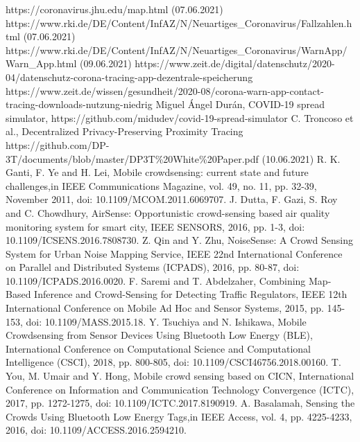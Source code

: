 \documentclass[conference,compsoc]{IEEEtran}
\begin{document}
\begin{thebibliography}{00}
 https://coronavirus.jhu.edu/map.html (07.06.2021)
 https://www.rki.de/DE/Content/InfAZ/N/Neuartiges\_Coronavirus/Fallzahlen.html (07.06.2021)
 https://www.rki.de/DE/Content/InfAZ/N/Neuartiges\_Coronavirus/WarnApp/Warn\_App.html (09.06.2021)
 https://www.zeit.de/digital/datenschutz/2020-04/datenschutz-corona-tracing-app-dezentrale-speicherung
 https://www.zeit.de/wissen/gesundheit/2020-08/corona-warn-app-contact-tracing-downloads-nutzung-niedrig
 Miguel Ángel Durán, COVID-19 spread simulator, 
https://github.com/midudev/covid-19-spread-simulator
 C. Troncoso et al., \glqq Decentralized Privacy-Preserving Proximity Tracing\grqq \\https://github.com/DP-3T/documents/blob/master/DP3T\%20White\%20Paper.pdf (10.06.2021)
 R. K. Ganti, F. Ye and H. Lei, \glqq Mobile crowdsensing: current state and future challenges,\grqq in IEEE Communications Magazine, vol. 49, no. 11, pp. 32-39, November 2011, doi: 10.1109/MCOM.2011.6069707.
 J. Dutta, F. Gazi, S. Roy and C. Chowdhury, \glqq AirSense: Opportunistic crowd-sensing based air quality monitoring system for smart city, IEEE SENSORS, 2016, pp. 1-3, doi: 10.1109/ICSENS.2016.7808730.
 Z. Qin and Y. Zhu, \glqq NoiseSense: A Crowd Sensing System for Urban Noise Mapping Service, IEEE 22nd International Conference on Parallel and Distributed Systems (ICPADS), 2016, pp. 80-87, doi: 10.1109/ICPADS.2016.0020.
 F. Saremi and T. Abdelzaher, \glqq Combining Map-Based Inference and Crowd-Sensing for Detecting Traffic Regulators, IEEE 12th International Conference on Mobile Ad Hoc and Sensor Systems, 2015, pp. 145-153, doi: 10.1109/MASS.2015.18.
 Y. Tsuchiya and N. Ishikawa, \glqq Mobile Crowdsensing from Sensor Devices Using Bluetooth Low Energy (BLE), International Conference on Computational Science and Computational Intelligence (CSCI), 2018, pp. 800-805, doi: 10.1109/CSCI46756.2018.00160.
 T. You, M. Umair and Y. Hong, \glqq Mobile crowd sensing based on CICN, International Conference on Information and Communication Technology Convergence (ICTC), 2017, pp. 1272-1275, doi: 10.1109/ICTC.2017.8190919.
 A. Basalamah, \glqq Sensing the Crowds Using Bluetooth Low Energy Tags,\grqq in IEEE Access, vol. 4, pp. 4225-4233, 2016, doi: 10.1109/ACCESS.2016.2594210.

\end{thebibliography}
\end{document}
